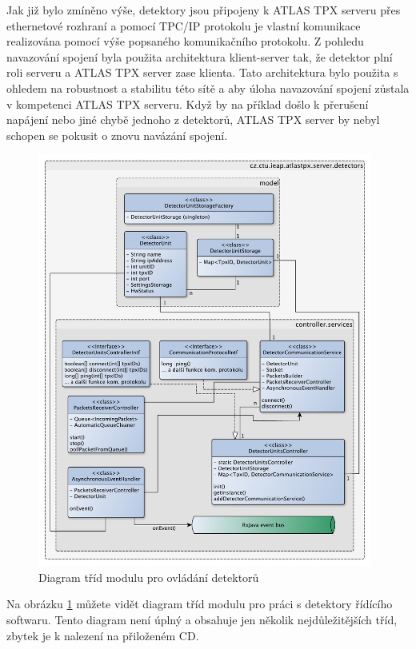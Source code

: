 Jak již bylo zmíněno výše, detektory jsou připojeny k ATLAS TPX serveru přes ethernetové rozhraní a pomocí TPC/IP protokolu je vlastní komunikace realizována pomocí výše popsaného komunikačního protokolu. Z pohledu navazování spojení byla použita architektura klient-server tak, že detektor plní roli serveru a ATLAS TPX server zase klienta. Tato architektura bylo použita s ohledem na robustnost a stabilitu této sítě a aby úloha navazování spojení zůstala v kompetenci ATLAS TPX serveru. Když by na příklad došlo k přerušení napájení nebo jiné chybě jednoho z detektorů, ATLAS TPX server by nebyl schopen se pokusit o znovu navázání spojení.

\begin{figure}[th]
	\begin{center}
		\includegraphics[width=11cm]{figures/atlas_tpx_detectors_class.pdf}
		\caption{Diagram tříd modulu pro ovládání detektorů}
		\label{fig:class:detectors}
	\end{center}
\end{figure}

Na obrázku \ref{fig:class:detectors} můžete vidět diagram tříd modulu pro práci s detektory řídícího softwaru. Tento diagram není úplný a obsahuje jen několik nejdůležitějších tříd, zbytek je k nalezení na přiloženém CD.

